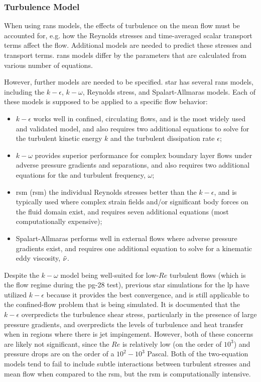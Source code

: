\documentclass[double,12pt]{beavtex}
\begin{document}
\subsubsection{Turbulence Model}

When using \acrshort{rans} models, the effects of turbulence on the mean flow must be accounted for, e.g. how the Reynolds stresses and time-averaged scalar transport terms affect the flow. Additional models are needed to predict these stresses and transport terms. \acrshort{rans} models differ by the parameters that are calculated from various number of equations. 

However, further models are needed to be specified. \acrshort{star} has several \acrshort{rans} models, including the $k-\epsilon$, $k-\omega$, Reynolds stress, and Spalart-Allmaras models. Each of these models is supposed to be applied to a specific flow behavior:
\begin{itemize}
    \item $k-\epsilon$ works well in confined, circulating flows, and is the most widely used and validated model, and also requires two additional equations to solve for the turbulent kinetic energy $k$ and the turbulent dissipation rate $\epsilon$;
    \item $k-\omega$ provides superior performance for complex boundary layer flows under adverse pressure gradients and separations, and also requires two additional equations for \acrshort{tke} and turbulent frequency, $\omega$;
    \item \acrlong{rsm} (\acrshort{rsm}) the individual Reynolds stresses better than the $k-\epsilon$, and is typically used where complex strain fields and/or significant body forces on the fluid domain exist, and requires seven additional equations (most computationally expensive);
    \item Spalart-Allmaras performs well in external flows where adverse pressure gradients exist, and requires one additional equation to solve for a kinematic eddy viscosity, $\Tilde{\nu}$. 
\end{itemize}

Despite the $k-\omega$ model being well-suited for low-$Re$ turbulent flows (which is the flow regime during the \acrshort{pg}-28 test), previous \acrshort{star} simulations for the \acrshort{lp} have utilized $k-\epsilon$ because it provides the best convergence, and is still applicable to the confined-flow problem that is being simulated. It is documented that the $k-\epsilon$ overpredicts the turbulence shear stress, particularly in the presence of large pressure gradients, and overpredicts the levels of turbulence and heat transfer when in regions where there is jet impingement. However, both of these concerns are likely not significant, since the $Re$ is relatively low (on the order of $10^{3}$) and pressure drops are on the order of a $10^{2}-10^{3}$ Pascal. Both of the two-equation models tend to fail to include subtle interactions between turbulent stresses and mean flow when compared to the \acrshort{rsm}, but the \acrshort{rsm} is computationally intensive. 
\end{document}
